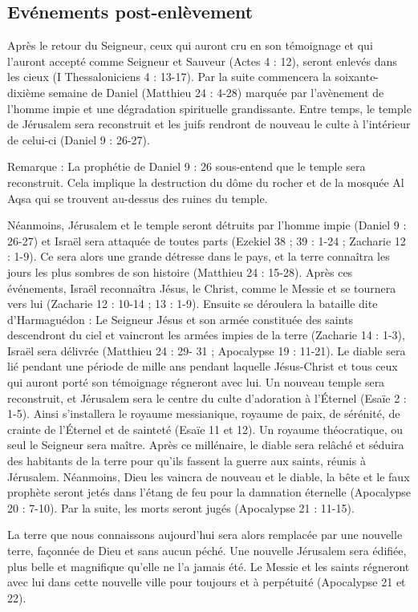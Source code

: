 \subsection*{Evénements post-enlèvement}

Après le retour du Seigneur, ceux qui auront cru en son témoignage et qui l'auront accepté comme Seigneur et Sauveur (Actes 4 : 12), seront enlevés dans les cieux (I Thessaloniciens 4 : 13-17).
Par la suite commencera la soixante-dixième semaine de Daniel (Matthieu 24 : 4-28) marquée par l'avènement de l'homme impie et une dégradation spirituelle grandissante. Entre temps, le temple de Jérusalem sera reconstruit et les juifs rendront de nouveau le culte à l'intérieur de celui-ci (Daniel 9 : 26-27).

Remarque : La prophétie de Daniel 9 : 26 sous-entend que le temple sera reconstruit. Cela implique la destruction du dôme du rocher et de la mosquée Al Aqsa qui se trouvent au-dessus des ruines du temple.

Néanmoins, Jérusalem et le temple seront détruits par l'homme impie (Daniel 9 : 26-27) et Israël sera attaquée de toutes parts (Ezekiel 38 ; 39 : 1-24 ; Zacharie 12 : 1-9). Ce sera alors une grande détresse dans le pays, et la terre connaîtra les jours les plus sombres de son histoire (Matthieu 24 : 15-28). Après ces événements, Israël reconnaîtra Jésus, le Christ, comme le Messie et se tournera vers lui (Zacharie 12 : 10-14 ; 13 : 1-9). Ensuite se déroulera la bataille dite d'Harmaguédon : Le Seigneur Jésus et son armée constituée des saints descendront du ciel et vaincront les armées impies de la terre (Zacharie 14 : 1-3), Israël sera délivrée (Matthieu 24 : 29- 31 ; Apocalypse 19 : 11-21).
Le diable sera lié pendant une période de mille ans pendant laquelle Jésus-Christ et tous ceux qui auront porté son témoignage régneront avec lui. Un nouveau temple sera reconstruit, et Jérusalem sera le centre du culte d'adoration à l’Éternel (Esaïe 2 : 1-5). Ainsi s'installera le royaume messianique, royaume de paix, de sérénité, de crainte de l’Éternel et de sainteté (Esaïe 11 et 12). Un royaume théocratique, ou seul le Seigneur sera maître.
Après ce millénaire, le diable sera relâché et séduira des habitants de la terre pour qu'ils fassent la guerre aux saints, réunis à Jérusalem. Néanmoins, Dieu les vaincra de nouveau et le diable, la bête et le faux prophète seront jetés dans l'étang de feu pour la damnation éternelle (Apocalypse 20 : 7-10). Par la suite, les morts seront jugés (Apocalypse 21 : 11-15).

La terre que nous connaissons aujourd'hui sera alors remplacée par une nouvelle terre, façonnée de Dieu et sans aucun péché. Une nouvelle Jérusalem sera édifiée, plus belle et magnifique qu'elle ne l'a jamais été. Le Messie et les saints régneront avec lui dans cette nouvelle ville pour toujours et à perpétuité (Apocalypse 21 et 22).

